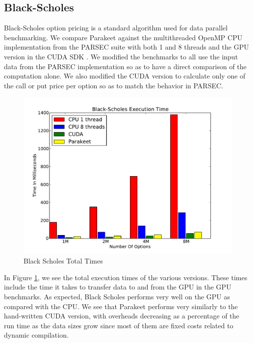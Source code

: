 \documentclass[10pt,twocolumn]{article}
\begin{document}
\subsection{Black-Scholes}
\label{results-bs}

Black-Scholes option pricing \cite{Blac73} is a standard algorithm used for data parallel benchmarking.  We compare Parakeet against the multithreaded OpenMP CPU implementation from the PARSEC \cite{Bien08} suite with both 1 and 8 threads and the GPU version in the CUDA SDK \cite{NvidSD}.  We modified the benchmarks to all use the input data from the PARSEC implementation so as to have a direct comparison of the computation alone.  We also modified the CUDA version to calculate only one of the call or put price per option so as to match the behavior in PARSEC.

\begin{figure}
\includegraphics[scale=0.4]{BSWCPU.pdf}
\caption{Black Scholes Total Times}
\label{BSCPU}
\end{figure}

In Figure \ref{BSCPU}, we see the total execution times of the various versions. These times include the time it takes to transfer data to and from the GPU in the GPU benchmarks.  As expected, Black Scholes performs very well on the GPU as compared with the CPU.  We see that Parakeet performs very similarly to the hand-written CUDA version, with overheads decreasing as a percentage of the run time as the data sizes grow since most of them are fixed costs related to dynamic compilation.
\end{document}
